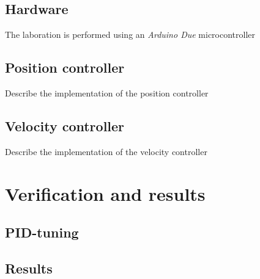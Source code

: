 \documentclass[11pt]{article}
\begin{document}
\subsection{Hardware}
The laboration is performed using an \emph{Arduino Due} microcontroller
\subsection{Position controller}
Describe the implementation of the position controller
\subsection{Velocity controller}
Describe the implementation of the velocity controller


\section{Verification and results}
\subsection{PID-tuning}
\subsection{Results}
\end{document}
